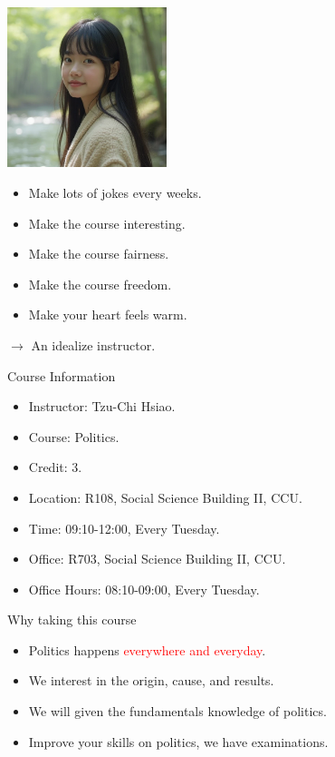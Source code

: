 \documentclass{beamer}
\begin{document}
\begin{frame}{}
\begin{center}
\includegraphics[width=0.35\textwidth]{tchsiao.png}
\end{center}
\begin{itemize}
\item Make lots of jokes every weeks.
\item Make the course interesting.
\item Make the course fairness.
\item Make the course freedom.
\item Make your heart feels warm.
\end{itemize}
$\rightarrow$ An idealize instructor.
\end{frame}
\begin{frame}{Course Information}
\begin{itemize}
\item Instructor: Tzu-Chi Hsiao.
\item Course: Politics.
\item Credit: 3.
\item Location: R108, Social Science Building II, CCU.
\item Time: 09:10-12:00, Every Tuesday.
\item Office: R703, Social Science Building II, CCU.
\item Office Hours: 08:10-09:00, Every Tuesday.
\end{itemize}
\end{frame}
\begin{frame}{Why taking this course}
\begin{itemize}
\item Politics happens \textcolor{red}{everywhere and everyday}.
\item We interest in the origin, cause, and results.
\item We will given the fundamentals knowledge of politics.
\item Improve your skills on politics, we have examinations.
\end{itemize}
\end{frame}
\end{document}
